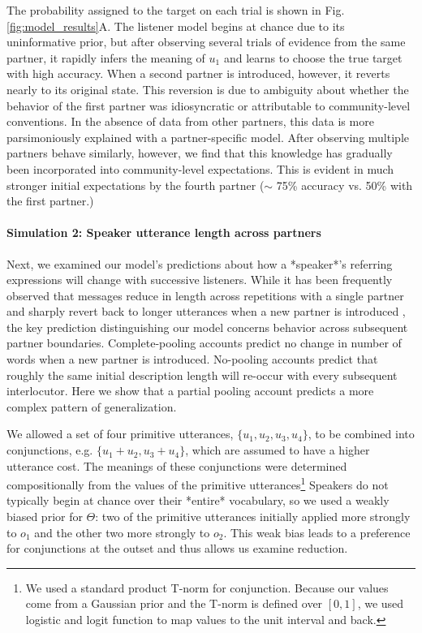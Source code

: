 The probability assigned to the target on each trial is shown in Fig. \ref{fig:model_results}A.
The listener model begins at chance due to its uninformative prior, but after observing several trials of evidence from the same partner, it rapidly infers the meaning of $u_1$ and learns to choose the true target with high accuracy.
When a second partner is introduced, however, it reverts nearly to its original state.
This reversion is due to ambiguity about whether the behavior of the first partner was idiosyncratic or attributable to community-level conventions.
In the absence of data from other partners, this data is more parsimoniously explained with a partner-specific model.
After observing multiple partners behave similarly, however, we find that this knowledge has gradually been incorporated into community-level expectations. 
This is evident in much stronger initial expectations by the fourth partner ($\sim$ 75\% accuracy vs. 50\% with the first partner.)

\paragraph{Simulation 2: Speaker utterance length across partners}

Next, we examined our model's predictions about how a *speaker*'s referring expressions will change with successive listeners.
While it has been frequently observed that messages reduce in length across repetitions with a single partner and sharply revert back to longer utterances when a new partner is introduced \cite{wilkes-gibbs_coordinating_1992}, the key prediction distinguishing our model concerns behavior across subsequent partner boundaries.
Complete-pooling accounts predict no change in number of words when a new partner is introduced.
No-pooling accounts predict that roughly the same initial description length will re-occur with every subsequent interlocutor. 
Here we show that a partial pooling account predicts a more complex pattern of generalization.

We allowed a set of four primitive utterances, $\{u_1, u_2, u_3, u_4\}$, to be combined into conjunctions, e.g. $\{u_1+u_2, u_3+u_4\}$, which are assumed to have a higher utterance cost.
The meanings of these conjunctions were determined compositionally from the values of the primitive utterances\footnote{We used a standard product T-norm for conjunction. Because our values come from a Gaussian prior and the T-norm is defined over $[0,1]$, we used logistic and logit function to map values to the unit interval and back.}
Speakers do not typically begin at chance over their *entire* vocabulary, so we used a weakly biased prior for $\Theta$: two of the primitive utterances initially applied more strongly to $o_1$ and the other two more strongly to $o_2$.
This weak bias leads to a preference for conjunctions at the outset and thus allows us examine reduction.

